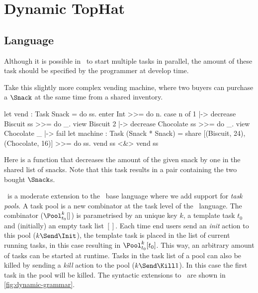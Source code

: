 
\section{Dynamic TopHat}

\subsection{Language}

Although it is possible in \TOPHAT\ to start multiple tasks in parallel,
the amount of these task should be specified by the programmer at develop time.

\begin{example}
  \label{exm:vending-shared}
  Take this slightly more complex vending machine,
  where two buyers can purchase a $\Snack$ at the same time from a shared inventory.

  \begin{TASK}[]
    let vend : Task Snack = do ss.
      enter Int >>= do n.
      case n of
        1 |-> decrease Biscuit ss >>= do _.
             view Biscuit
        2 |-> decrease Chocolate ss >>= do _.
             view Chocolate
        _ |-> fail
    let machine : Task (Snack * Snack) =
      share [(Biscuit, 24), (Chocolate, 16)] >>= do ss.
      vend ss <&> vend ss
  \end{TASK}

  Here  is a function that decreases the amount of the given snack by one in the shared list of snacks.
  Note that this task results in a pair containing the two bought $\Snack$s.
\end{example}

\DYNTOPHAT\ is a moderate extension to the \TOPHAT\ base language where we add support for \emph{task pools}.
A task pool is a new combinator at the task level of the \TOPHAT\ language.
The combinator ($\Pool^k_{t_0} []$) is parametrised by an unique key $k$, a template task $t_0$ and (initially) an empty task list $[]$.
Each time end users send an \emph{init} action to this pool ($k\Send\Init$),
the template task is placed in the list of current running tasks,
in this case resulting in $\Pool^k_{t_0} [t_0]$.
This way, an arbitrary amount of tasks can be started at runtime.
Tasks in the task list of a pool can also be killed by sending a \emph{kill} action to the pool ($k\Send\Kill1$).
In this case the first task in the pool will be killed.
The syntactic extensions to \TOPHAT\ are shown in \cref{fig:dynamic-grammar}.

